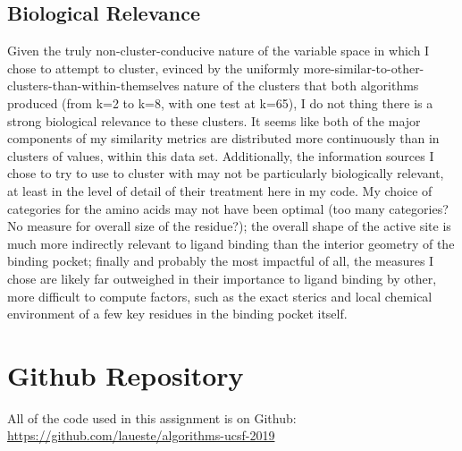 \documentclass{article}
\begin{document}
\subsection{Biological Relevance}
Given the truly non-cluster-conducive nature of the variable space in which I chose to attempt to cluster, evinced by the uniformly more-similar-to-other-clusters-than-within-themselves nature of the clusters that both algorithms produced (from k=2 to k=8, with one test at k=65), I do not thing there is a strong biological relevance to these clusters. It seems like both of the major components of my similarity metrics are distributed more continuously than in clusters of values, within this data set. Additionally, the information sources I chose to try to use to cluster with may not be particularly biologically relevant, at least in the level of detail of their treatment here in my code. My choice of categories for the amino acids may not have been optimal (too many categories? No measure for overall size of the residue?); the overall shape of the active site is much more indirectly relevant to ligand binding than the interior geometry of the binding pocket; finally and probably the most impactful of all, the measures I chose are likely far outweighed in their importance to ligand binding by other, more difficult to compute factors, such as the exact sterics and local chemical environment of a few key residues in the binding pocket itself. 


\section{Github Repository}
All of the code used in this assignment is on Github: \url{https://github.com/laueste/algorithms-ucsf-2019}
\end{document}
